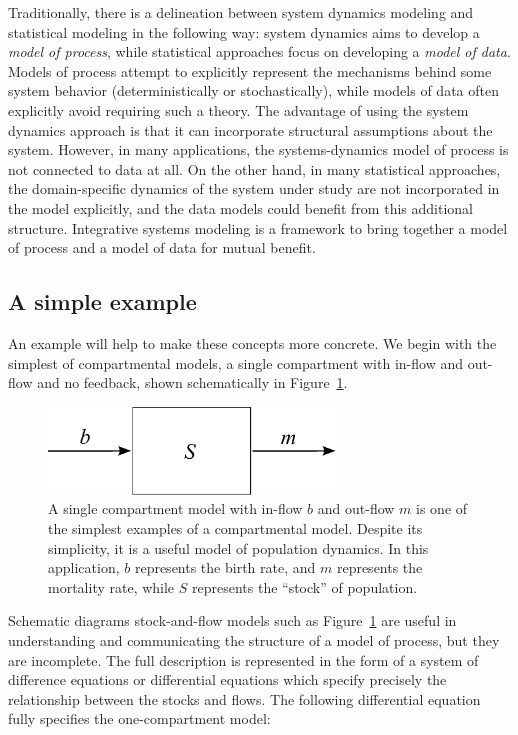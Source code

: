 Traditionally, there is a delineation between system dynamics modeling
and statistical modeling in the following way: system dynamics aims to
develop a \emph{model of process}, while statistical approaches focus
on developing a \emph{model of data}. Models of process attempt to
explicitly represent the mechanisms behind some system behavior
(deterministically or stochastically), while models of data often
explicitly avoid requiring such a theory. The advantage of using the
system dynamics approach is that it can incorporate structural
assumptions about the system.  However, in many applications, the
systems-dynamics model of process is not connected to data at all.  On
the other hand, in many statistical approaches, the domain-specific
dynamics of the system under study are not incorporated in the model
explicitly, and the data models could benefit from this additional
structure.  Integrative systems modeling is a framework to bring
together a model of process and a model of data for mutual benefit.

\subsection{A simple example}

An example will help to make these concepts more concrete.  We begin
with the simplest of compartmental models, a single compartment with
in-flow and out-flow and no feedback, shown schematically in
Figure~\ref{forward-sim-one-compartment}.

\begin{figure}[h]
\begin{center}
\includegraphics[width=3in]{S.pdf}
\caption{A single compartment model with in-flow $b$ and out-flow $m$
  is one of the simplest examples of a compartmental model. Despite
  its simplicity, it is a useful model of population dynamics.  In
  this application, $b$ represents the birth rate, and $m$ represents
  the mortality rate, while $S$ represents the ``stock'' of
  population.}
\label{forward-sim-one-compartment}
\end{center}
\end{figure}


Schematic diagrams stock-and-flow models such as
Figure~\ref{forward-sim-one-compartment} are useful in understanding
and communicating the structure of a model of process, but they are
incomplete. The full description is represented in the form of a
system of difference equations or differential equations which specify
precisely the relationship between the stocks and flows. The following
differential equation fully specifies the one-compartment model:

